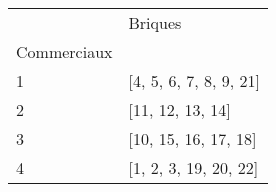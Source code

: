 \documentclass[preview]{standalone}
\begin{document}
    \begin{tabular}{ll}
\toprule
 & Briques \\
Commerciaux &  \\
\midrule
1 & [4, 5, 6, 7, 8, 9, 21] \\
2 & [11, 12, 13, 14] \\
3 & [10, 15, 16, 17, 18] \\
4 & [1, 2, 3, 19, 20, 22] \\
\bottomrule
\end{tabular}

    
\end{document}
